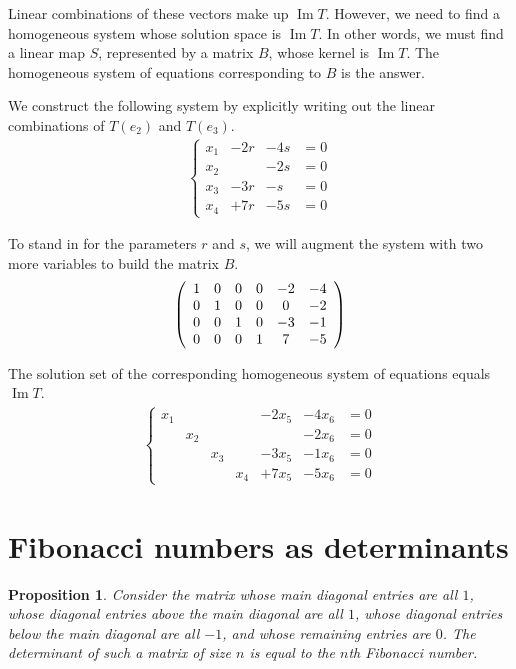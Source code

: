 \documentclass{article}
\newtheorem{proposition}{Proposition}
\DeclareMathOperator{\im}{Im}
\begin{document}
Linear combinations of these vectors make up $\im{T}$. However, we need to find
a homogeneous system whose solution space is $\im{T}$. In other words, we must
find a linear map $S$, represented by a matrix $B$, whose kernel is $\im{T}$.
The homogeneous system of equations corresponding to $B$ is the answer.

We construct the following system by explicitly writing out the linear combinations of $T(e_2)$ and $T(e_3)$.
\begin{eqnarray*}
    \left\{
        \begin{aligned}
            x_1 & -2r & -4s &= 0 \\
            x_2 & & -2s &= 0 \\
            x_3 & -3r & -s &= 0 \\
            x_4 & +7r & -5s &= 0
        \end{aligned}
    \right.
\end{eqnarray*}

To stand in for the parameters $r$ and $s$, we will augment the system with two more variables to build the matrix $B$.
$$\left(
    \begin{array}{c c c c c c}
        1 & 0 & 0 & 0 & -2 & -4 \\
        0 & 1 & 0 & 0 & 0 & -2 \\
        0 & 0 & 1 & 0 & -3 & -1 \\
        0 & 0 & 0 & 1 & 7 & -5
    \end{array}
\right)$$

The solution set of the corresponding homogeneous system of equations equals $\im{T}$.
\begin{eqnarray*}
    \left\{
        \begin{aligned}
            x_1 &  &  &  & -2 x_5 & -4 x_6 &= 0 \\
             & x_2 &  &  &  & -2 x_6 &= 0 \\
             &  & x_3 &  & -3 x_5 & -1 x_6 &= 0 \\
             &  &  & x_4 & + 7 x_5 & -5 x_6 &= 0
        \end{aligned}
    \right.
\end{eqnarray*}

\section{Fibonacci numbers as determinants}

\begin{proposition}
    Consider the matrix whose main diagonal entries are all $1$, whose diagonal
    entries above the main diagonal are all $1$, whose diagonal entries
    below the main diagonal are all $-1$, and whose remaining entries are $0$.
    The determinant of such a matrix of size $n$ is equal to the $n$th
    Fibonacci number.
\end{proposition}
\end{document}
